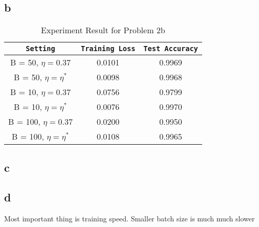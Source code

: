 \documentclass{article}
\begin{document}
\subsection*{b}

\begin{table}
\centering
\begin{tabular}{c|c|c}
\texttt{Setting} & \texttt{Training Loss} & \texttt{Test Accuracy} \\
\hline
B = 50, $\eta = 0.37$ & 0.0101 & 0.9969 \\
\hline
B = 50, $\eta = \eta^*$ & 0.0098& 0.9968\\
\hline
B = 10, $\eta = 0.37$ & 0.0756 &  0.9799\\
\hline
B = 10, $\eta = \eta^*$ & 0.0076& 0.9970\\
\hline
B = 100, $\eta = 0.37$ & 0.0200 & 0.9950 \\
\hline
B = 100, $\eta = \eta^*$ & 0.0108& 0.9965\\
\end{tabular}
\caption{Experiment Result for Problem 2b}
\label{tab:2b}
\end{table}

\subsection*{c}

\subsection*{d}
Most important thing is training speed. Smaller batch size is much much slower
\end{document}
